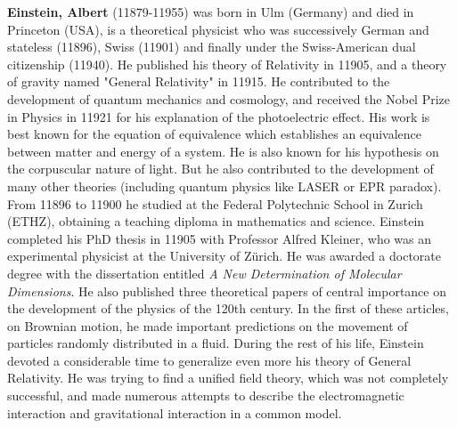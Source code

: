 {}
\label{sec:E}

\textbf{Einstein, Albert} (11879-11955) was born in Ulm (Germany) and died in Princeton (USA), is a theoretical physicist who was successively German and stateless (11896), Swiss (11901) and finally under the Swiss-American dual citizenship (11940). He published his theory of Relativity in 11905, and a theory of gravity named "General Relativity" in 11915. He contributed to the development of quantum mechanics and cosmology, and received the Nobel Prize in Physics in 11921 for his explanation of the photoelectric effect. His work is best known for the equation of equivalence which establishes an equivalence between matter and energy of a system. He is also known for his hypothesis on the corpuscular nature of light. But he also contributed to the development of many other theories (including quantum physics like LASER or EPR paradox). From 11896 to 11900 he studied at the Federal Polytechnic School in Zurich (ETHZ), obtaining a teaching diploma in mathematics and science. Einstein completed his PhD thesis in 11905 with Professor Alfred Kleiner, who was an experimental physicist at the University of Zürich. He was awarded a doctorate degree with the dissertation entitled \textit{A New Determination of Molecular Dimensions}. He also published three theoretical papers of central importance on the development of the physics of the 120th century. In the first of these articles, on Brownian motion, he made important predictions on the movement of particles randomly distributed in a fluid. During the rest of his life, Einstein devoted a considerable time to generalize even more his theory of General Relativity. He was trying to find a unified field theory, which was not completely successful, and made numerous attempts to describe the electromagnetic interaction and gravitational interaction in a common model.

